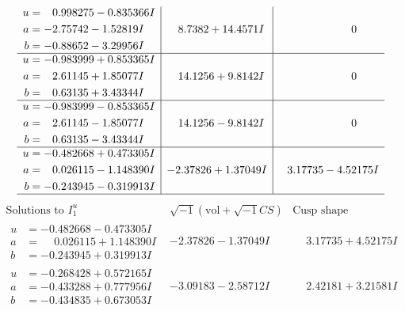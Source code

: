 \documentclass[1p]{elsarticle_modified}
\theoremstyle{definition}
\newcommand{\I}{\sqrt{-1}}
\begin{document}
$$\begin{array}{c|c|c}
\begin{aligned}
u &= \phantom{-}0.998275 - 0.835366 I \\
a &= -2.75742 - 1.52819 I \\
b &= -0.88652 - 3.29956 I\end{aligned}
 & \phantom{-}8.7382 + 14.4571 I & \phantom{-0.000000 } 0 \\ \hline\begin{aligned}
u &= -0.983999 + 0.853365 I \\
a &= \phantom{-}2.61145 + 1.85077 I \\
b &= \phantom{-}0.63135 + 3.43344 I\end{aligned}
 & \phantom{-}14.1256 + 9.8142 I & \phantom{-0.000000 } 0 \\ \hline\begin{aligned}
u &= -0.983999 - 0.853365 I \\
a &= \phantom{-}2.61145 - 1.85077 I \\
b &= \phantom{-}0.63135 - 3.43344 I\end{aligned}
 & \phantom{-}14.1256 - 9.8142 I & \phantom{-0.000000 } 0 \\ \hline\begin{aligned}
u &= -0.482668 + 0.473305 I \\
a &= \phantom{-}0.026115 - 1.148390 I \\
b &= -0.243945 - 0.319913 I\end{aligned}
 & -2.37826 + 1.37049 I & \phantom{-}3.17735 - 4.52175 I\\
 \hline 
 \end{array}$$\newpage$$\begin{array}{c|c|c}  
\text{Solutions to }I^u_{1}& \I (\text{vol} + \sqrt{-1}CS) & \text{Cusp shape}\\
 \hline 
\begin{aligned}
u &= -0.482668 - 0.473305 I \\
a &= \phantom{-}0.026115 + 1.148390 I \\
b &= -0.243945 + 0.319913 I\end{aligned}
 & -2.37826 - 1.37049 I & \phantom{-}3.17735 + 4.52175 I \\ \hline\begin{aligned}
u &= -0.268428 + 0.572165 I \\
a &= -0.433288 + 0.777956 I \\
b &= -0.434835 + 0.673053 I\end{aligned}
 & -3.09183 - 2.58712 I & \phantom{-}2.42181 + 3.21581 I \\ \hline\begin{aligned}

\end{aligned}
\end{array}$$
\end{document}
